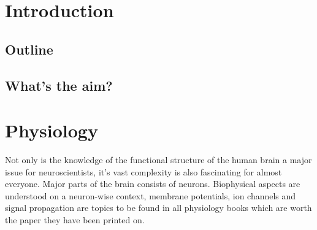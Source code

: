 \newpage

\section{Introduction}
\label{sec:intro}

\subsection{Outline}
\subsection{What's the aim?}

\section{Physiology}
Not only is the knowledge of the functional structure of the human brain a major issue for neuroscientists, it's vast complexity is also fascinating for almost everyone.
Major parts of the brain consists of neurons. 
Biophysical aspects are understood on a neuron-wise context, membrane potentials, ion channels and signal propagation are topics to be found in all physiology books which are worth the paper they have been printed on.\cite[577 et. seq.]{guyton}

